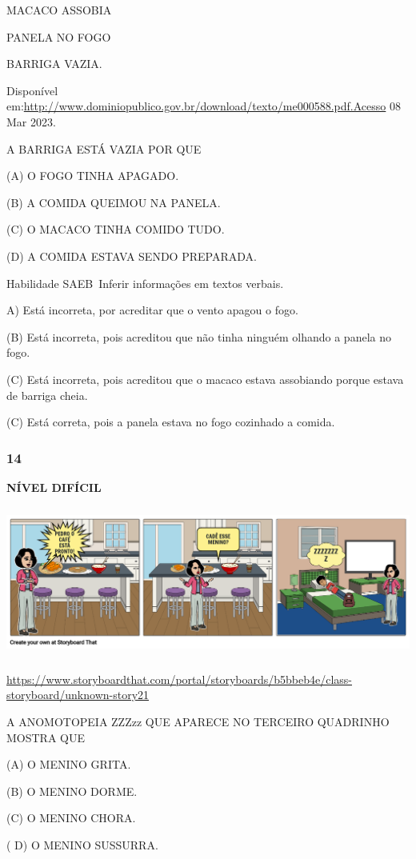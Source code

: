 MACACO ASSOBIA

PANELA NO FOGO

BARRIGA VAZIA.

Disponível
em:\url{http://www.dominiopublico.gov.br/download/texto/me000588.pdf.Acesso}
08 Mar 2023.

A BARRIGA ESTÁ VAZIA POR QUE

(A) O FOGO TINHA APAGADO.

(B) A COMIDA QUEIMOU NA PANELA.

(C) O MACACO TINHA COMIDO TUDO.

(D) A COMIDA ESTAVA SENDO PREPARADA.

Habilidade SAEB~Inferir informações em textos verbais.

A) Está incorreta, por acreditar que o vento apagou o fogo.

(B) Está incorreta, pois acreditou que não tinha ninguém olhando a
panela no fogo.

(C) Está incorreta, pois acreditou que o macaco estava assobiando porque
estava de barriga cheia.

(C) Está correta, pois a panela estava no fogo cozinhado a comida.

\subsubsection{14}\label{section-107}

\textbf{NÍVEL DIFÍCIL}

\includegraphics[width=5.90556in,height=1.95556in]{media/image146.png}

\url{https://www.storyboardthat.com/portal/storyboards/b5bbeb4e/class-storyboard/unknown-story21}

A ANOMOTOPEIA ZZZzz QUE APARECE NO TERCEIRO QUADRINHO MOSTRA QUE

(A) O MENINO GRITA.

(B) O MENINO DORME.

(C) O MENINO CHORA.

( D) O MENINO SUSSURRA.

